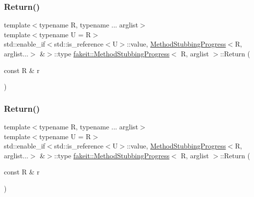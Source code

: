 \mbox{\label{structfakeit_1_1MethodStubbingProgress_ab20141c6f552c3aa3399660c520c2ba4}} 
\subsubsection{\texorpdfstring{Return()}{Return()}\hspace{0.1cm}{\footnotesize\ttfamily [24/45]}}
{\footnotesize\ttfamily template$<$typename R, typename ... arglist$>$ \\
template$<$typename U  = R$>$ \\
std\+::enable\+\_\+if$<$std\+::is\+\_\+reference$<$U$>$\+::value, \mbox{\hyperlink{structfakeit_1_1MethodStubbingProgress}{Method\+Stubbing\+Progress}}$<$R, arglist...$>$ \&$>$\+::type \mbox{\hyperlink{structfakeit_1_1MethodStubbingProgress}{fakeit\+::\+Method\+Stubbing\+Progress}}$<$ R, arglist $>$\+::Return (\begin{DoxyParamCaption}\item[{const R \&}]{r }\end{DoxyParamCaption})\hspace{0.3cm}{\ttfamily [inline]}}

\mbox{\label{structfakeit_1_1MethodStubbingProgress_ab20141c6f552c3aa3399660c520c2ba4}} 
\subsubsection{\texorpdfstring{Return()}{Return()}\hspace{0.1cm}{\footnotesize\ttfamily [25/45]}}
{\footnotesize\ttfamily template$<$typename R, typename ... arglist$>$ \\
template$<$typename U  = R$>$ \\
std\+::enable\+\_\+if$<$std\+::is\+\_\+reference$<$U$>$\+::value, \mbox{\hyperlink{structfakeit_1_1MethodStubbingProgress}{Method\+Stubbing\+Progress}}$<$R, arglist...$>$ \&$>$\+::type \mbox{\hyperlink{structfakeit_1_1MethodStubbingProgress}{fakeit\+::\+Method\+Stubbing\+Progress}}$<$ R, arglist $>$\+::Return (\begin{DoxyParamCaption}\item[{const R \&}]{r }\end{DoxyParamCaption})\hspace{0.3cm}{\ttfamily [inline]}}

